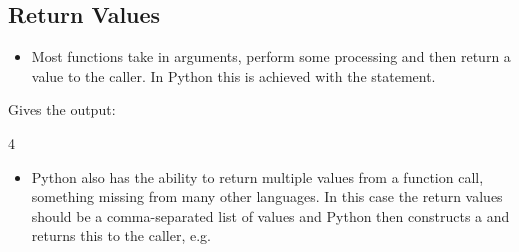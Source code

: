 \documentclass[letterpaper,10pt,english,openany]{sphinxmanual}
\begin{document}
\subsection{Return Values}
\label{\detokenize{introduction_to_python/working_with_functions:return-values}}\begin{itemize}
\item {} 
Most functions take in arguments, perform some processing and then
return a value to the caller. In Python this is achieved with the
 statement.

\end{itemize}

\begin{sphinxVerbatim}[commandchars=\\\{\}]
 
     

  
\end{sphinxVerbatim}

Gives the output:

\begin{sphinxVerbatim}[commandchars=\\\{\}]
4
\end{sphinxVerbatim}
\begin{itemize}
\item {} 
Python also has the ability to return multiple values from a function
call, something missing from many other languages. In this case the
return values should be a comma-separated list of values and Python
then constructs a  and returns this to the caller, e.g.

\end{itemize}

\begin{sphinxVerbatim}[commandchars=\\\{\}]
 
      

  
\end{sphinxVerbatim}
\end{document}
